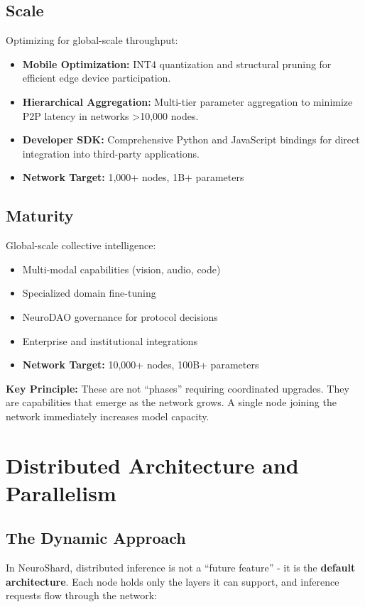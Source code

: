 \documentclass[11pt,a4paper]{article}
\begin{document}
\subsection{Scale}
Optimizing for global-scale throughput:
\begin{itemize}
    \item \textbf{Mobile Optimization:} INT4 quantization and structural pruning for efficient edge device participation.
    \item \textbf{Hierarchical Aggregation:} Multi-tier parameter aggregation to minimize P2P latency in networks >10,000 nodes.
    \item \textbf{Developer SDK:} Comprehensive Python and JavaScript bindings for direct integration into third-party applications.
    \item \textbf{Network Target:} 1,000+ nodes, 1B+ parameters
\end{itemize}

\subsection{Maturity}
Global-scale collective intelligence:
\begin{itemize}
    \item Multi-modal capabilities (vision, audio, code)
    \item Specialized domain fine-tuning
    \item NeuroDAO governance for protocol decisions
    \item Enterprise and institutional integrations
    \item \textbf{Network Target:} 10,000+ nodes, 100B+ parameters
\end{itemize}

\textbf{Key Principle:} These are not ``phases'' requiring coordinated upgrades. They are capabilities that emerge as the network grows. A single node joining the network immediately increases model capacity.

\section{Distributed Architecture and Parallelism}

\subsection{The Dynamic Approach}

In NeuroShard, distributed inference is not a ``future feature'' - it is the \textbf{default architecture}. Each node holds only the layers it can support, and inference requests flow through the network:
\end{document}
